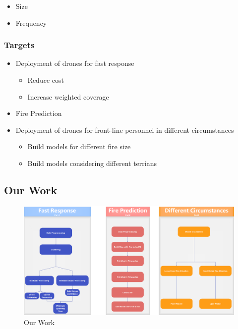 \documentclass{mcmthesis}
\begin{document}
\begin{spacing}{1}
\begin{itemize}
    \begin{itemize}
    \item
      Size
    \item
      Frequency
    \end{itemize}
  \end{itemize}

\subsubsection{Targets}


\begin{itemize}
  \item
    Deployment of drones for fast response
  
    \begin{itemize}
    \item
      Reduce cost
    \item
      Increase weighted coverage
    \end{itemize}
  \item
    Fire Prediction
  \item
    Deployment of drones for front-line personnel in different
    circumstances
  
    \begin{itemize}
    \item
      Build models for different fire size
    \item
      Build models considering different terrians
    \end{itemize}
  \end{itemize}

\subsection{Our Work}
\begin{figure}[h!]
  \includegraphics[width=\linewidth]{flowchart1.png}
  \caption{Our Work}
\end{figure}


\end{spacing}
\end{document}
